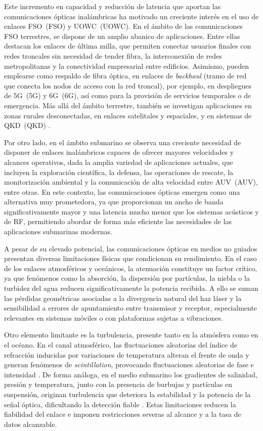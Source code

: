 Este incremento en capacidad y reducción de latencia que aportan las comunicaciones ópticas inalámbricas ha motivado un creciente interés en el uso de enlaces \acs{FSO}~(\acl{FSO}) y \acs{UOWC}~(\acl{UOWC}). En el ámbito de las comunicaciones FSO terrestres, se dispone de un amplio abanico de aplicaciones. Entre ellas destacan los enlaces de última milla, que permiten conectar usuarios finales con redes troncales sin necesidad de tender fibra, la interconexión de redes metropolitanas y la conectividad empresarial entre edificios. Asimismo, pueden emplearse como respaldo de fibra óptica, en enlaces de \textit{backhaul} (tramo de red que conecta los nodos de acceso con la red troncal), por ejemplo, en despliegues de \acs{5G}~(\acl{5G}) y \acs{6G}~(\acl{6G}), así como para la provisión de servicios temporales o de emergencia\cite{Willebrand}. Más allá del ámbito terrestre, también se investigan aplicaciones en zonas rurales desconectadas, en enlaces satelitales y espaciales, y en sistemas de \acs{QKD}~(\acl{QKD}) \cite{Sun}.

Por otro lado, en el ámbito submarino se observa una creciente necesidad de disponer de enlaces inalámbricos capaces de ofrecer mayores velocidades y alcances operativos, dada la amplia variedad de aplicaciones actuales, que incluyen la exploración científica, la defensa, las operaciones de rescate, la monitorización ambiental y la comunicación de alta velocidad entre \acs{AUV}~(\acl{AUV}), entre otras. En este contexto, las comunicaciones ópticas emergen como una alternativa muy prometedora, ya que proporcionan un ancho de banda significativamente mayor y una latencia mucho menor que los sistemas acústicos y de RF, permitiendo abordar de forma más eficiente las necesidades de las aplicaciones submarinas modernas\cite{Zeng,Sun}.

A pesar de su elevado potencial, las comunicaciones ópticas en medios no guiados presentan diversas limitaciones físicas que condicionan su rendimiento. En el caso de los enlaces atmosféricos y oceánicos, la atenuación constituye un factor crítico, ya que fenómenos como la absorción, la dispersión por partículas, la niebla o la turbidez del agua reducen significativamente la potencia recibida. A ello se suman las pérdidas geométricas asociadas a la divergencia natural del haz láser y la sensibilidad a errores de apuntamiento entre transmisor y receptor, especialmente relevantes en sistemas móviles o con plataformas sujetas a vibraciones.

Otro elemento limitante es la turbulencia, presente tanto en la atmósfera como en el océano. En el canal atmosférico, las fluctuaciones aleatorias del índice de refracción inducidas por variaciones de temperatura alteran el frente de onda y generan fenómenos de \textit{scintillation}, provocando fluctuaciones aleatorias de fase e intensidad \cite{Trichili}. De forma análoga, en el medio submarino los gradientes de salinidad, presión y temperatura, junto con la presencia de burbujas y partículas en suspensión, originan turbulencia que deteriora la estabilidad y la potencia de la señal óptica, dificultando la detección fiable \cite{Sun}. Estas limitaciones reducen la fiabilidad del enlace e imponen restricciones severas al alcance y a la tasa de datos alcanzable.

